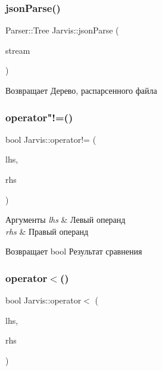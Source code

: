 \subsubsection{\texorpdfstring{json\+Parse()}{jsonParse()}}
{\footnotesize\ttfamily Parser\+::\+Tree Jarvis\+::json\+Parse (\begin{DoxyParamCaption}\item[{Parser\+::string\+Target \&}]{stream }\end{DoxyParamCaption})}

\begin{DoxyReturn}{Возвращает}
Дерево, распарсенного файла 
\end{DoxyReturn}
\mbox{\label{namespaceJarvis_a30effa4f0618d13d82a08b61222841c3}} 
\subsubsection{\texorpdfstring{operator"!=()}{operator!=()}}
{\footnotesize\ttfamily bool Jarvis\+::operator!= (\begin{DoxyParamCaption}\item[{const \hyperlink{classJarvis_1_1Sentence}{Sentence} \&}]{lhs,  }\item[{const \hyperlink{classJarvis_1_1Sentence}{Sentence} \&}]{rhs }\end{DoxyParamCaption})}


\begin{DoxyParams}{Аргументы}
{\em lhs} & Левый операнд \\
\hline
{\em rhs} & Правый операнд \\
\hline
\end{DoxyParams}
\begin{DoxyReturn}{Возвращает}
bool Результат сравнения 
\end{DoxyReturn}
\mbox{\label{namespaceJarvis_a150bb3f2da01868ba25056a7b602420a}} 
\subsubsection{\texorpdfstring{operator$<$()}{operator<()}}
{\footnotesize\ttfamily bool Jarvis\+::operator$<$ (\begin{DoxyParamCaption}\item[{const \hyperlink{classJarvis_1_1Sentence}{Sentence} \&}]{lhs,  }\item[{const \hyperlink{classJarvis_1_1Sentence}{Sentence} \&}]{rhs }\end{DoxyParamCaption})}


